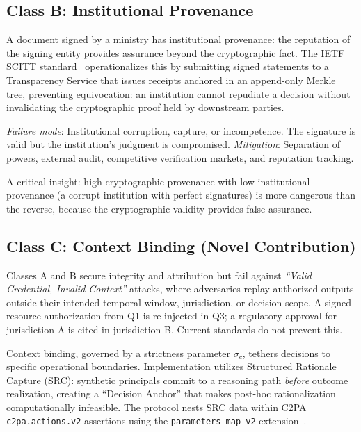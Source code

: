 \documentclass[runningheads]{llncs}
\begin{document}
\subsection{Class B: Institutional Provenance}

A document signed by a ministry has institutional provenance: the reputation of the signing entity provides assurance beyond the cryptographic fact. The IETF SCITT standard~\cite{birkholz2025scitt} operationalizes this by submitting signed statements to a Transparency Service that issues receipts anchored in an append-only Merkle tree, preventing equivocation: an institution cannot repudiate a decision without invalidating the cryptographic proof held by downstream parties.

\emph{Failure mode}: Institutional corruption, capture, or incompetence. The signature is valid but the institution's judgment is compromised. \emph{Mitigation}: Separation of powers, external audit, competitive verification markets, and reputation tracking.

A critical insight: high cryptographic provenance with low institutional provenance (a corrupt institution with perfect signatures) is more dangerous than the reverse, because the cryptographic validity provides false assurance.

\subsection{Class C: Context Binding (Novel Contribution)}
\label{sec:contextbinding}

Classes A and B secure integrity and attribution but fail against \emph{``Valid Credential, Invalid Context''} attacks, where adversaries replay authorized outputs outside their intended temporal window, jurisdiction, or decision scope. A signed resource authorization from Q1 is re-injected in Q3; a regulatory approval for jurisdiction A is cited in jurisdiction B. Current standards do not prevent this.

Context binding, governed by a strictness parameter $\sigma_c$, tethers decisions to specific operational boundaries. Implementation utilizes Structured Rationale Capture (SRC): synthetic principals commit to a reasoning path \emph{before} outcome realization, creating a ``Decision Anchor'' that makes post-hoc rationalization computationally infeasible. The protocol nests SRC data within C2PA \texttt{c2pa.actions.v2} assertions using the \texttt{parameters-map-v2} extension~\cite{c2pa2024}.
\end{document}
